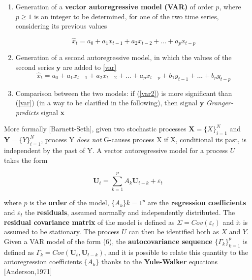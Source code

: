 \documentclass[12pt, a4paper]{article}
\begin{document}
\begin{enumerate}
	
	\item Generation of a \textbf{vector autoregressive model (VAR)} of order $p$, where $p\ge 1$ is an integer to be determined, for one of the two time series, considering its previous values
	
	\begin{equation}
	\hat{x}_t = a_0 + a_1 x_{t-1} + a_2 x_{t-2} + \dots + a_p x_{t-p} \label{var}
	\end{equation}
	
	
	\item Generation of a second autoregressive model, in which the values of the second series $\textbf{y}$ are added  to  \ref{var}
	\begin{equation}
	\hat{x}_t = a_0 + a_1 x_{t-1} + a_2 x_{t-2} + \dots + a_p x_{t-p} + b_1 y_{t-1} + \dots + b_p y_{t-p} \label{var2}
	\end{equation}
	
	
	\item Comparison between the two models: if  (\ref{var2}) is more significant  than  (\ref{var}) (in a way to be clarified in the following), then signal $\textbf{y}$ \textit{Granger-predicts} signal \textbf{x} 
	
\end{enumerate}

More formally [Barnett-Seth], given two stochastic processes $ \textbf{X} = \{X\}_{i=1}^N $ and $ \textbf{Y} = \{Y\}_{i=1}^N $, process Y \textit{does not} G-causes process X if X, conditional its past, is independent by the past of Y. A vector autoregressive model for a process $U$ takes the form

\begin{equation}
\textbf{U}_t = \sum_{k=1}^{p} A_k \textbf{U}_{t-k} + \varepsilon_t 
\end{equation}



where $p$ is the \textbf{order} of the model, $\{ A_k\}{k=1}^p$ are the \textbf{regression coefficients} and $\varepsilon_t$ the \textbf{residuals}, assumed normally and independently distributed. The \textbf{ residual covariance matrix} of the model is defined as $ \Sigma = Cov(\varepsilon_t) $ and it is assumed to be stationary. The process $U$ can then be identified both as $X$ and $Y$. Given a VAR model of the form (6), the \textbf{autocovariance sequence} $ \{\Gamma_k\}_{k=1}^p $ is defined as $ \Gamma_k = Cov(\textbf{U}_t,\textbf{U}_{t-k})$, and it is possible to relate this quantity to the autoregression coefficients $\{ A_k\}$ thanks to the \textbf{Yule-Walker} equations [Anderson,1971]
\end{document}
